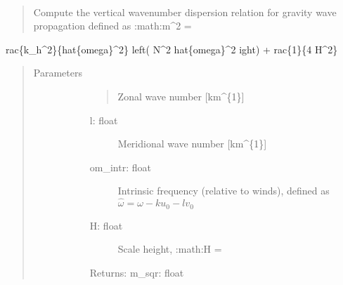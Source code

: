 \documentclass[letterpaper,10pt,english]{sphinxmanual}
\begin{document}
\begin{fulllineitems}
\label{\detokenize{stochprop.gravity:stochprop.gravity_waves.m_sqr}}~\begin{quote}

\sphinxAtStartPar
Compute the vertical wavenumber dispersion relation for gravity wave propagation
defined as :math:{\color{red}\bfseries{}\textasciigrave{}}m\textasciicircum{}2 =
\end{quote}

\sphinxAtStartPar
rac\{k\_h\textasciicircum{}2\}\{hat\{omega\}\textasciicircum{}2\} left( N\textasciicircum{}2 \sphinxhyphen{} hat\{omega\}\textasciicircum{}2 
ight) + 
rac\{1\}\{4 H\textasciicircum{}2\}\textasciigrave{}
\begin{quote}\begin{description}
\item[{Parameters}] \leavevmode\begin{description}
\item[{}] \leavevmode\begin{quote}

\sphinxAtStartPar
Zonal wave number {[}km\textasciicircum{}\{\sphinxhyphen{}1\}{]}
\end{quote}
\begin{description}
\item[{l: float}] \leavevmode
\sphinxAtStartPar
Meridional wave number {[}km\textasciicircum{}\{\sphinxhyphen{}1\}{]}

\item[{om\_intr: float}] \leavevmode
\sphinxAtStartPar
Intrinsic frequency (relative to winds), defined as \(\hat{\omega} = \omega - k u_0 - l v_0\)

\item[{H: float}] \leavevmode
\sphinxAtStartPar
Scale height, :math:{\color{red}\bfseries{}\textasciigrave{}}H =

\end{description}

\item[{}] \leavevmode
\item[{}] \leavevmode
\item[{}] \leavevmode
\item[{}] \leavevmode
\sphinxAtStartPar
Returns:
m\_sqr: float
\begin{quote}


\end{quote}
\end{description}
\end{description}
\end{quote}
\end{fulllineitems}
\end{document}
